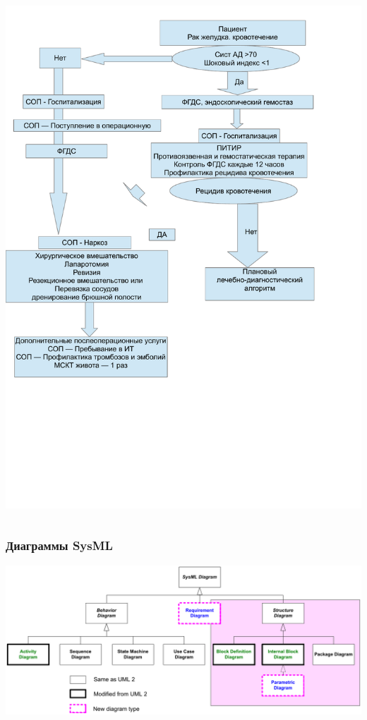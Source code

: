 \documentclass[10pt]{beamer}
\begin{document}
\begin{frame}
\begin{columns}[t]
\begin{column}{0.5\textwidth}
    \includegraphics[width=1\linewidth]{qms-pics/sop-ex-2.pdf}
    \end{column}
  \end{columns}
\end{frame}
\begin{frame}
  \frametitle{Диаграммы SysML }
  \centering
    \includegraphics[width=1\linewidth]{qms-pics/diagrams.pdf}
\end{frame}
\end{document}
